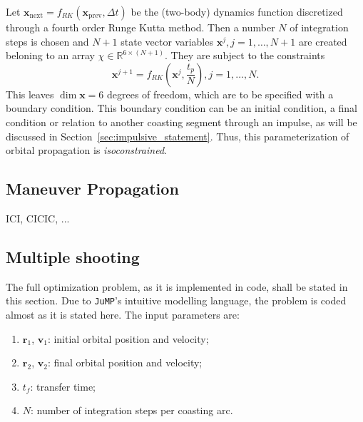 Let \(\mathbf{x}_{\text{next}} = f_{RK}(\mathbf{x}_{\text{prev}}, \Delta t)\) be the (two-body) dynamics function discretized through a fourth order Runge Kutta method. Then a number \(N\) of integration steps is chosen and \(N+1\) state vector variables \(\mathbf{x}^j, j=1,\dots,N+1\) are created beloning to an array \(\chi \in \mathbb{R}^{6 \times (N+1)}\). They are subject to the constraints
\begin{equation}
    \mathbf{x}^{j+1} = f_{RK}(\mathbf{x}^j, \frac{t_p}{N}), j = 1, \dots, N.
\end{equation}
This leaves \(\dim \mathbf{x} = 6\) degrees of freedom, which are to be specified with a boundary condition. This boundary condition can be an initial condition, a final condition or relation to another coasting segment through an impulse, as will be discussed in Section~\ref{sec:impulsive_statement}. Thus, this parameterization of orbital propagation is \textit{isoconstrained}.

\subsection{Maneuver Propagation}

ICI, CICIC, ...



\subsection{Multiple shooting}

The full optimization problem, as it is implemented in code, shall be stated in this section. Due to \texttt{JuMP}'s intuitive modelling language, the problem is coded almost as it is stated here. The input parameters are:
\begin{enumerate}
    \item \(\mathbf{r}_1\), \(\mathbf{v}_1\): initial orbital position and velocity;
    \item \(\mathbf{r}_2\), \(\mathbf{v}_2\): final orbital position and velocity;
    \item \(t_f\): transfer time;
    \item \(N\): number of integration steps per coasting arc.
\end{enumerate}

